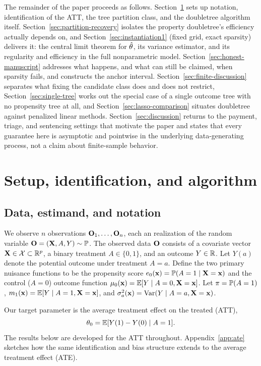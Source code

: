 \documentclass[12pt]{article}
\begin{document}
The remainder of the paper proceeds as follows. Section~\ref{sec:setup} sets up notation, identification of the ATT, the tree partition class, and the doubletree algorithm itself. Section~\ref{sec:partition-recovery} isolates the property doubletree's efficiency actually depends on, and Section~\ref{sec:instantiation1} (fixed grid, exact sparsity) delivers it: the central limit theorem for $\hat{\theta}$, its variance estimator, and its regularity and efficiency in the full nonparametric model. Section~\ref{sec:honest-manuscript} addresses what happens, and what can still be claimed, when sparsity fails, and constructs the anchor interval. Section~\ref{sec:finite-discussion} separates what fixing the candidate class does and does not restrict, Section~\ref{sec:single-tree} works out the special case of a single outcome tree with no propensity tree at all, and Section~\ref{sec:lasso-comparison} situates doubletree against penalized linear methods. Section~\ref{sec:discussion} returns to the payment, triage, and sentencing settings that motivate the paper and states that every guarantee here is asymptotic and pointwise in the underlying data-generating process, not a claim about finite-sample behavior.


\section{Setup, identification, and algorithm}
\label{sec:setup}


\subsection{Data, estimand, and notation}

We observe $n$ observations $\mathbf{O}_1, \ldots, \mathbf{O}_n$, each an \iid realization of the random variable $\mathbf{O} = (\mathbf{X}, A, Y) \sim \mathbb{P}$. The observed data $\mathbf{O}$ consists of a covariate vector $\mathbf{X} \in \mathcal{X} \subset \mathbb{R}^p$, a binary treatment $A \in \{0,1\}$, and an outcome $Y \in \mathbb{R}$. Let $Y(a)$ denote the potential outcome under treatment $A = a$. Define the two primary nuisance functions to be the propensity score $e_0(\mathbf{x})=\mathbb{P}(A=1\mid \mathbf{X}=\mathbf{x})$ and the control ($A=0$) outcome function $\mu_0(\mathbf{x})=\mathbb{E}[Y\mid A=0,\mathbf{X}=\mathbf{x}]$. Let $\pi=\mathbb{P}(A=1)$, $m_1(\mathbf{x})=\mathbb{E}[Y\mid A=1,\mathbf{X}=\mathbf{x}]$, and $\sigma_a^2(\mathbf{x})=\operatorname{Var}(Y\mid A=a,\mathbf{X}=\mathbf{x})$.

Our target parameter is the average treatment effect on the treated (ATT),
\begin{equation}
\label{eq:att}
\theta_0 = \mathbb{E}[Y(1) - Y(0) \mid A=1].
\end{equation}
The results below are developed for the ATT throughout. Appendix~\ref{app:ate} sketches how the
same identification and bias structure extends to the average treatment effect (ATE).
\end{document}
